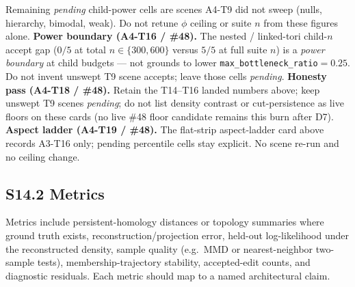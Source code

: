 \documentclass[11pt]{article}
\begin{document}
Remaining \emph{pending} child-power cells are scenes A4-T9 did not
sweep (nulls, hierarchy, bimodal, weak). Do not retune $\phi$ ceiling
or suite $n$ from these figures alone.
\textbf{Power boundary (A4-T16 / \#48).}
The nested / linked-tori child-$n$ accept gap ($0/5$ at total
$n{\in}\{300,600\}$ versus $5/5$ at full suite $n$) is a
\emph{power boundary} at child budgets --- not grounds to lower
\texttt{max\_bottleneck\_ratio}${=}0.25$. Do not invent unswept T9
scene accepts; leave those cells \emph{pending}.
\textbf{Honesty pass (A4-T18 / \#48).}
Retain the T14--T16 landed numbers above; keep unswept T9 scenes
\emph{pending}; do not list density contrast or cut-persistence as
live floors on these cards (no live \#48 floor candidate remains this
burn after D7).
\textbf{Aspect ladder (A4-T19 / \#48).}
The flat-strip aspect-ladder card above records A3-T16 only; pending
percentile cells stay explicit. No scene re-run and no ceiling change.


\subsection*{S14.2 Metrics}
Metrics include persistent-homology distances or topology summaries where ground truth exists, reconstruction/projection error, held-out log-likelihood under the reconstructed density, sample quality (e.g.\ MMD or nearest-neighbor two-sample tests), membership-trajectory stability, accepted-edit counts, and diagnostic residuals. Each metric should map to a named architectural claim.
\end{document}
